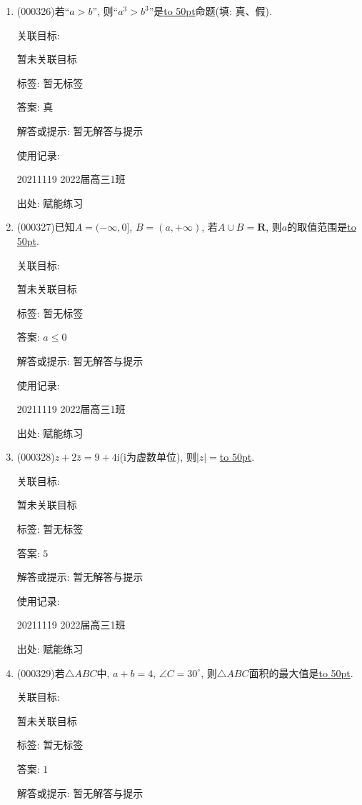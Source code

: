 \documentclass[10pt,a4paper]{article}
\newcommand{\blank}[1]{\underline{\hbox to #1pt{}}}
\begin{document}
\begin{enumerate}[1.]

\item { (000326)}若``$a>b$'', 则``$a^3>b^3$''是\blank{50}命题(填: 真、假).


关联目标:

暂未关联目标



标签: 暂无标签

答案: 真

解答或提示: 暂无解答与提示

使用记录:

20211119	2022届高三1班	


出处: 赋能练习
\item { (000327)}已知$A=(-\infty ,0]$, $B=(a,+\infty )$, 若$A\cup B=\mathbf{R}$, 则$a$的取值范围是\blank{50}.


关联目标:

暂未关联目标



标签: 暂无标签

答案: $a\le 0$

解答或提示: 暂无解答与提示

使用记录:

20211119	2022届高三1班	


出处: 赋能练习
\item { (000328)}$z+2\bar{z}=9+4\mathrm{i}$($\mathrm{i}$为虚数单位), 则$|z|=$\blank{50}.


关联目标:

暂未关联目标



标签: 暂无标签

答案: $5$

解答或提示: 暂无解答与提示

使用记录:

20211119	2022届高三1班	


出处: 赋能练习
\item { (000329)}若$\triangle ABC$中, $a+b=4$, $\angle C=30^\circ$, 则$\triangle ABC$面积的最大值是\blank{50}.


关联目标:

暂未关联目标



标签: 暂无标签

答案: $1$

解答或提示: 暂无解答与提示


\end{enumerate}
\end{document}
